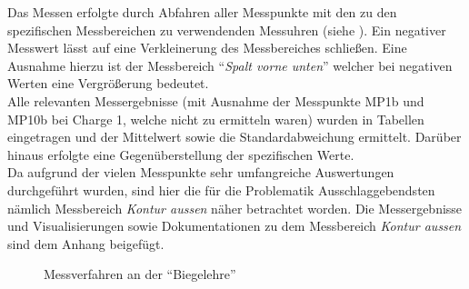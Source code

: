 \documentclass[12pt,a4paper,parskip]{scrartcl}
\begin{document}
 
Das Messen erfolgte durch Abfahren aller Messpunkte mit den zu den spezifischen Messbereichen zu verwendenden Messuhren (siehe ). Ein negativer Messwert lässt auf eine Verkleinerung des Messbereiches schließen. Eine Ausnahme hierzu ist der Messbereich "`\emph{Spalt vorne unten}"' welcher  bei negativen Werten eine Vergrößerung bedeutet.\\
 Alle relevanten Messergebnisse (mit Ausnahme der Messpunkte MP1b und MP10b bei Charge 1, welche nicht zu ermitteln waren) wurden in Tabellen eingetragen und  der Mittelwert sowie die Standardabweichung
 ermittelt. Darüber hinaus erfolgte eine Gegenüberstellung der spezifischen Werte.\\
Da aufgrund der vielen Messpunkte  sehr umfangreiche Auswertungen durchgeführt wurden,  sind hier die für die Problematik Ausschlaggebendsten nämlich Messbereich \emph{Kontur aussen} näher betrachtet worden. Die Messergebnisse und Visualisierungen sowie Dokumentationen zu dem Messbereich \emph{Kontur aussen} sind dem Anhang beigefügt. 
\begin{figure}[hbtp]
\centering
\hfill
{}
\hfill
{}
\hfill
\caption{Messverfahren an der "`Biegelehre"' }
\label{fig:messverfahren}
\end{figure}
\end{document}
